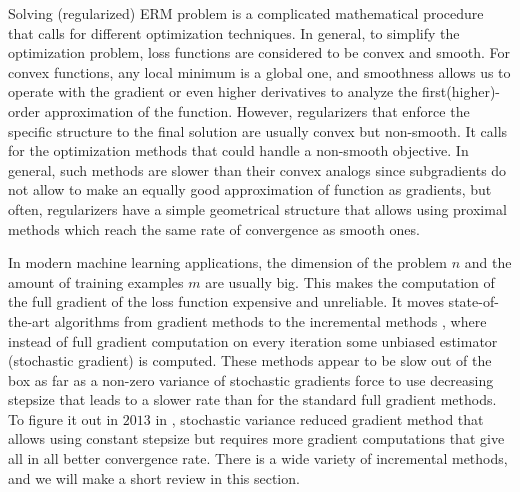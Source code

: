 Solving (regularized) ERM problem is a complicated mathematical procedure that calls for different optimization techniques. In general, to simplify the optimization problem, loss functions are considered to be convex and smooth. For convex functions, any local minimum is a global one, and smoothness allows us to operate with the gradient or even higher derivatives to analyze the first(higher)-order approximation of the function. However, regularizers that enforce the specific structure to the final solution are usually convex but non-smooth. It calls for the optimization methods that could handle a non-smooth objective. In general, such methods are slower than their convex analogs since subgradients do not allow to make an equally good approximation of function as gradients, but often, regularizers have a simple geometrical structure that allows using proximal methods which reach the same rate of convergence as smooth ones.

In modern machine learning applications, the dimension of the problem $n$ and the amount of training examples $m$ are usually big. This makes the computation of the full gradient of the loss function expensive and unreliable. It moves state-of-the-art algorithms from gradient methods \cite{nesterov-book} to the incremental methods \cite{bertsekas2011incremental, bottou2010large}, where instead of full gradient computation on every iteration some unbiased estimator (stochastic gradient) is computed. These methods appear to be slow out of the box as far as a non-zero variance of stochastic gradients force to use decreasing stepsize that leads to a slower rate than for the standard full gradient methods. To figure it out in $2013$ in \cite{johnson2013accelerating}, stochastic variance reduced gradient method that allows using constant stepsize but requires more gradient computations that give all in all better convergence rate. {\color{blue}There is a wide variety of incremental methods, and we will make a short review in this section.}

